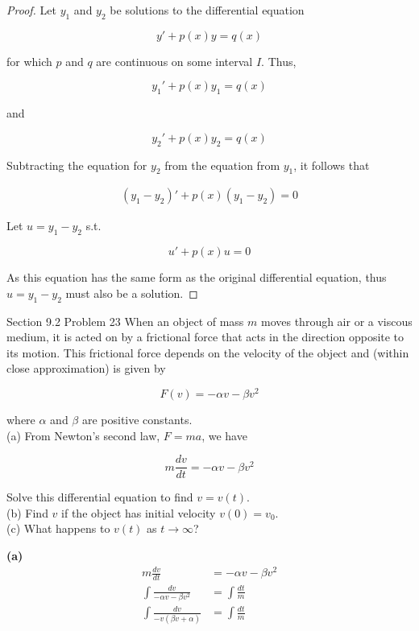 \documentclass{article}
\begin{document}
    \begin{proof}
        Let $y_1$ and $y_2$ be solutions to the differential equation

        \[
            y' + p(x)y = q(x)
        \]

        for which $p$ and $q$ are continuous on some interval $I$. Thus,

        \[
            y_1' + p(x)y_1 = q(x)
        \]

        and

        \[
            y_2' + p(x)y_2 = q(x)
        \]

        Subtracting the equation for $y_2$ from the equation from $y_1$, it follows that

        \begin{align*}
            (y_1 - y_2)' + p(x)(y_1 - y_2)  = 0
        \end{align*}

        Let $u = y_1 - y_2$ s.t.

        \[
            u' + p(x)u = 0
        \]

        As this equation has the same form as the original differential equation, thus $u=y_1 - y_2$ must also be a solution.
    \end{proof}



    \begin{tbhtheorem}{Section 9.2 Problem 23}
        When an object of mass $m$ moves through air or a viscous medium, it is acted on by a frictional force that acts in the direction opposite to its motion. This frictional force depends on the velocity of the object
        and (within close approximation) is given by

        \[
            F(v) = -\alpha v - \beta v^2
        \]

        where $\alpha$ and $\beta$ are positive constants. \\
        (a) From Newton's second law, $F=ma$, we have

        \[
            m\frac{dv}{dt} = -\alpha v - \beta v^2
        \]

        Solve this differential equation to find $v=v(t)$. \\
        (b) Find $v$ if the object has initial velocity $v(0) = v_0$. \\
        (c) What happens to $v(t)$ as $t\rightarrow \infty$?
    \end{tbhtheorem}

    \textbf{(a)}
    \begin{align*}
        m \frac{dv}{dt}     &= -\alpha v - \beta v^2 \\
        \int \frac{dv}{-\alpha v - \beta v^2} &= \int \frac{dt}{m}\\
        \int \frac{dv}{-v(\beta v+\alpha)}    &= \int \frac{dt}{m}
    \end{align*}
\end{document}
